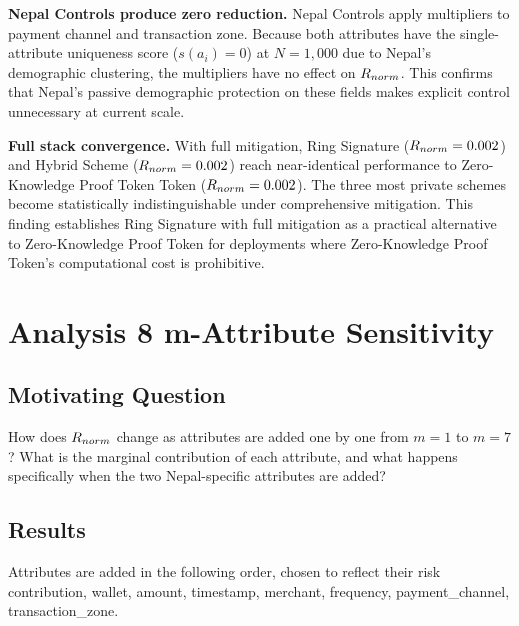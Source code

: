 \textbf{Nepal Controls produce zero reduction.} Nepal Controls
apply multipliers to payment channel and transaction zone.
Because both attributes have the single-attribute uniqueness score ($s(a_i) = 0$) at $N = 1{,}000$
due to Nepal's demographic clustering, the multipliers have
no effect on $R_{norm}$. This confirms that Nepal's passive
demographic protection on these fields makes explicit control
unnecessary at current scale.

\textbf{Full stack convergence.} With full mitigation, Ring
Signature ($R_{norm} = 0.002$) and Hybrid Scheme
($R_{norm} = 0.002$) reach near-identical performance to Zero-Knowledge Proof Token
Token ($R_{norm} = 0.002$). The three most private schemes
become statistically indistinguishable under comprehensive
mitigation. This finding establishes Ring Signature with
full mitigation as a practical alternative to Zero-Knowledge Proof Token for
deployments where Zero-Knowledge Proof Token's computational cost is prohibitive.

\section{Analysis 8 m-Attribute Sensitivity}\label{sec:a8}

\subsection{Motivating Question}

How does $R_{norm}$ change as attributes are added one by one
from $m = 1$ to $m = 7$? What is the marginal contribution
of each attribute, and what happens specifically when the
two Nepal-specific attributes are added?

\subsection{Results}

Attributes are added in the following order, chosen to
reflect their risk contribution, wallet, amount, timestamp,
merchant, frequency, payment\_channel, transaction\_zone.

